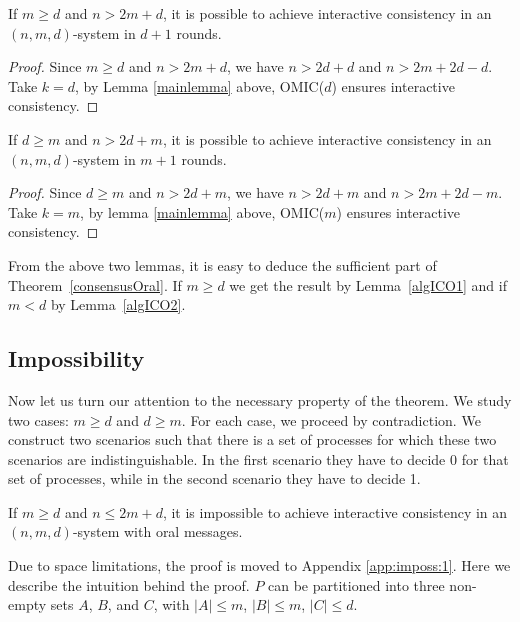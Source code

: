 \begin{lemma}\label{algICO1}
  If $m \geqslant d$ and $n>2m+d$, it is possible to achieve interactive consistency in an $(n,m,d)$-system 
  in $d+1$ rounds.
\end{lemma}

\begin{proof}
  Since $m \geqslant d$ and $n>2m+d$, we have $n>2d+d$ and $n >2m+2d-d$. Take
  $k=d$, by Lemma \ref{mainlemma} above, OMIC($d$) ensures
  interactive consistency. 
\end{proof}

\begin{lemma}\label{algICO2}
  If $d \geqslant m$ and $n>2d+m$, it is possible to achieve interactive consistency in an $(n,m,d)$-system 
 in $m+1$ rounds.
\end{lemma}

\begin{proof}
  Since $d \geqslant m$ and $n>2d+m$, we have $n>2d+m$ and $n >2m+2d-m$. Take
  $k=m$, by lemma \ref{mainlemma} above, OMIC($m$) ensures
  interactive consistency.
\end{proof}

From the above two lemmas, it is easy to deduce the sufficient part of 
Theorem~\ref{consensusOral}. 
If $m \geqslant d$ we get the result by Lemma~\ref{algICO1} and  if $m<d$ by Lemma~\ref{algICO2}.



\subsection{Impossibility}\label{oralImpossibility}

Now let us turn our attention to the necessary property of the theorem. We study two cases: $m \geqslant d$
and $d \geqslant m$. For each case, we proceed by contradiction.
We construct two scenarios such that there is a set of processes for which these two scenarios are indistinguishable. 
In the first scenario they have to decide 0 for that set of processes, while in the second scenario they have to decide 1.






\begin{lemma}\label{imposs:1}
  If $m \geqslant d$ and $n \leqslant 2m+d$, it is impossible to achieve interactive consistency in an $(n,m,d)$-system with oral messages.
  \end{lemma}

Due to space limitations, the proof is moved to Appendix \ref{app:imposs:1}. Here we describe the intuition behind the proof.
  $P$ can be partitioned into three non-empty sets $A$, $B$, and $C$,
  with $| A | \leqslant m$, $| B | \leqslant m$, $| C | \leqslant d$. 
  
